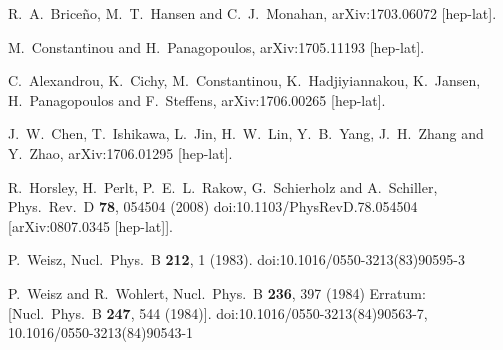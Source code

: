 \documentclass[english,preprint,aps,prd,showpacs,superscriptaddress,nofootinbib,tightenlines]{revtex4}
\begin{document}
\begin{thebibliography}{99}
  R.~A.~Brice\~no, M.~T.~Hansen and C.~J.~Monahan,
  arXiv:1703.06072 [hep-lat].


  M.~Constantinou and H.~Panagopoulos,
  arXiv:1705.11193 [hep-lat].


  C.~Alexandrou, K.~Cichy, M.~Constantinou, K.~Hadjiyiannakou, K.~Jansen, H.~Panagopoulos and F.~Steffens,
  arXiv:1706.00265 [hep-lat].


  J.~W.~Chen, T.~Ishikawa, L.~Jin, H.~W.~Lin, Y.~B.~Yang, J.~H.~Zhang and Y.~Zhao,
  arXiv:1706.01295 [hep-lat].

  R.~Horsley, H.~Perlt, P.~E.~L.~Rakow, G.~Schierholz and A.~Schiller,
  Phys.\ Rev.\ D {\bf 78}, 054504 (2008)
  doi:10.1103/PhysRevD.78.054504
  [arXiv:0807.0345 [hep-lat]].


  P.~Weisz,
  Nucl.\ Phys.\ B {\bf 212}, 1 (1983).
  doi:10.1016/0550-3213(83)90595-3


  P.~Weisz and R.~Wohlert,
  Nucl.\ Phys.\ B {\bf 236}, 397 (1984)
  Erratum: [Nucl.\ Phys.\ B {\bf 247}, 544 (1984)].
  doi:10.1016/0550-3213(84)90563-7, 10.1016/0550-3213(84)90543-1




\end{thebibliography}
\end{document}
